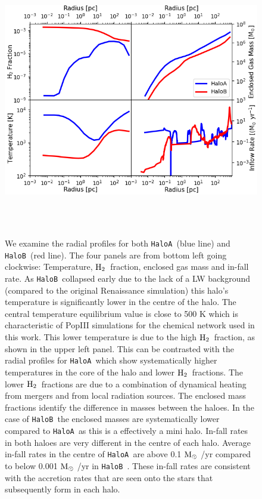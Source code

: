 \documentclass[graphics, twocolumn, usenatbib]{mn2e}
\newcommand{\msolar} {$\rm{M_{\odot}}~$}
\newcommand{\molH} {$\rm{H_2}$~}
\newcommand{\ha} {\texttt{HaloA~}}
\newcommand{\hb} {\texttt{HaloB~}}
\begin{document}
\begin{figure}
\centering
\begin{minipage}{175mm}      \begin{center}
\centerline{
    \includegraphics[width=18.0cm, height=12cm]{FIGURES/MultiPlot.png}}
\caption{We examine the radial profiles for both \ha (blue line) and \hb (red line). The four panels
  are from bottom left going clockwise: Temperature, \molH fraction, enclosed gas mass and in-fall rate.
  As \hb collapsed early due to the lack of a LW background (compared to the original Renaissance simulation)
  this halo's temperature is significantly lower in the centre of the halo. The central temperature equilibrium
  value is close to 500 K which is characteristic of PopIII simulations for the chemical network used in this work.
  This lower temperature is due to the high \molH fraction, as shown in the upper left panel. This can
  be contrasted with the radial profiles for \ha which show systematically higher temperatures in the core of the
  halo and lower \molH fractions. The lower \molH fractions are due to a combination of dynamical heating from
  mergers and from local radiation sources. The enclosed mass fractions identify the difference
  in masses between the haloes. In the case of \hb the enclosed masses are systematically lower compared
  to \ha as this is a effectively a mini halo. In-fall rates in both haloes are very different in the
  centre of each halo. Average in-fall rates in the centre of \ha are above 0.1 \msolar/yr compared
  to below 0.001 \msolar/yr in \hb. These in-fall rates are consistent with the accretion rates
  that are seen onto the stars that subsequently form in each halo. }
\label{Fig:RadialProfiles}
\end{center} \end{minipage}
\end{figure}
\end{document}
